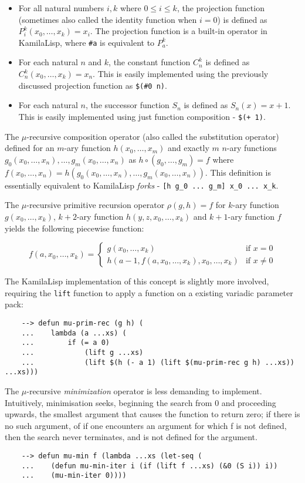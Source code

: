 \begin{itemize}
    \item For all natural numbers $i, k$ where $0 \le i \le k$, the projection function (sometimes also called the identity function when $i=0$) is defined as $P_i^k(x_0, \dots, x_k)=x_i$. The projection function is a built-in operator in KamilaLisp, where \verb|#a| is equivalent to $P_a^k$.
    \item For each natural $n$ and $k$, the constant function $C_n^k$ is defined as $C_n^k(x_0, \dots, x_k) = x_n$. This is easily implemented using the previously discussed projection function as \verb|$(#0 n)|.
    \item For each natural $n$, the successor function $S_n$ is defined as $S_n(x) = x + 1$. This is easily implemented using just function composition - \verb|$(+ 1)|.
\end{itemize}

The $\mu$-recursive composition operator (also called the substitution operator) defined for an $m$-ary function $h(x_0, \dots, x_m)$ and exactly $m$ $n$-ary functions $g_0(x_0, \dots, x_n), \dots, g_m(x_0, \dots, x_n)$ as $h\circ(g_0, \dots, g_m) = f$ where $f(x_0, \dots, x_n) = h(g_0(x_0, \dots, x_n), \dots, g_m(x_0, \dots, x_n))$. This definition is essentially equivalent to KamilaLisp \textit{forks} - \verb|[h g_0 ... g_m] x_0 ... x_k|.

The $\mu$-recursive primitive recursion operator $\rho(g,h)=f$ for $k$-ary function $g(x_0,\dots,x_k)$, $k+2$-ary function $h(y,z,x_0,\dots,x_k)$ and $k+1$-ary function $f$ yields the following piecewise function:

\begin{equation*}
f(a,x_0,\dots,x_k)=
    \begin{cases}
        g(x_0,\dots,x_k) & \text{if } x = 0\\
        h(a-1,f(a,x_0,\dots,x_k),x_0,\dots,x_k) & \text{if } x \ne 0
    \end{cases}
\end{equation*}

The KamilaLisp implementation of this concept is slightly more involved, requiring the \verb|lift| function to apply a function on a existing variadic parameter pack:

\begin{Verbatim}
    --> defun mu-prim-rec (g h) (
    ...    lambda (a ...xs) (
    ...        if (= a 0)
    ...            (lift g ...xs)
    ...            (lift $(h (- a 1) (lift $(mu-prim-rec g h) ...xs)) ...xs)))
\end{Verbatim}

The $\mu$-recursive \textit{minimization} operator is less demanding to implement. Intuitively, minimisation seeks, beginning the search from 0 and proceeding upwards, the smallest argument that causes the function to return zero; if there is no such argument, of if one encounters an argument for which f is not defined, then the search never terminates, and is not defined for the argument.

\begin{Verbatim}
    --> defun mu-min f (lambda ...xs (let-seq (
    ...    (defun mu-min-iter i (if (lift f ...xs) (&0 (S i)) i))
    ...    (mu-min-iter 0))))
\end{Verbatim}
